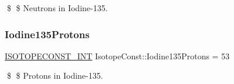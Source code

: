 \$ \$ Neutrons in Iodine-\/135. \mbox{\label{group___isotope_const-_iodine-_i135_ga555fcaddb756e0d4372d07e8ec7dbd93}} 
\subsubsection{\texorpdfstring{Iodine135\+Protons}{Iodine135Protons}}
{\footnotesize\ttfamily \mbox{\hyperlink{group___isotope_const-_macros_ga5f18360b3e99483a35c32d789e62621c}{I\+S\+O\+T\+O\+P\+E\+C\+O\+N\+S\+T\+\_\+\+I\+NT}} Isotope\+Const\+::\+Iodine135\+Protons = 53}

\$ \$ Protons in Iodine-\/135. 